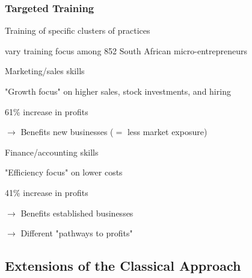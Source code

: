 \documentclass[hideothersubsections, usenames,dvipsnames,11pt]{beamer}
\newenvironment{itemize_2pt}{\itemize\addtolength{\itemsep}{2pt}}{\enditemize}
\newenvironment{enumerate_2pt}{\enumerate\addtolength{\itemsep}{2pt}}{\endenumerate}
\begin{document}
\begin{frame}
\frametitle{Targeted Training}

Training of specific clusters of practices
\begin{itemize_2pt}	
	\item \citet{Anderson2018} vary \textcolor{bdf}{training focus} among 852 South African micro-entrepreneurs
	
	\vspace{0.5em}	
	
	\begin{enumerate_2pt}
	
		\item Marketing/sales skills
		\begin{itemize_2pt}
			\item \textcolor{bdf}{"Growth focus" on higher sales, stock investments, and hiring}
			\item 61\% increase in profits
			\item[] $\rightarrow$ Benefits new businesses ($=$ less market exposure)
		\end{itemize_2pt}		
		
		\item Finance/accounting skills
		
		\pause		
		
		\begin{itemize_2pt}
			\item \textcolor{bdf}{"Efficiency focus" on lower costs}
			\item 41\% increase in profits
			\item[] $\rightarrow$ Benefits established businesses
		\end{itemize_2pt}
			
	\end{enumerate_2pt}
	
		\item[] $\rightarrow$ Different "pathways to profits"

\end{itemize_2pt}

\end{frame}


\subsection{Extensions of the Classical Approach}
\end{document}
